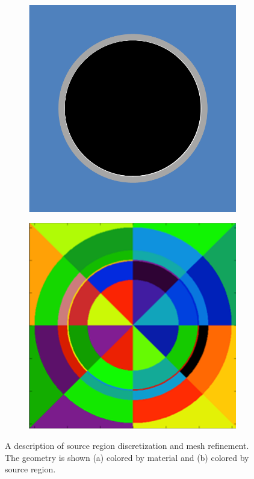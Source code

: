 \begin{figure}[h!]
	\centering
	\begin{subfigure}{0.45\textwidth}
		\centering
		\includegraphics[width=\linewidth]{figures/pin_1.PNG}
		\caption{}
		\label{fig:pin-discretization-a}
	\end{subfigure}
	\begin{subfigure}{0.45\textwidth}
		\centering
		\includegraphics[width=\linewidth]{figures/pin_1_discretized.PNG}
		\caption{}
		\label{fig:pin-discretization-b}
	\end{subfigure}
	\caption[]{A description of source region discretization and mesh refinement. The geometry is shown (a) colored by material and (b) colored by source region.}
	\label{fig:pin-discretization}
\end{figure}

